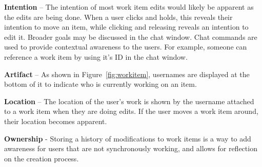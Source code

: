\documentclass[conference]{IEEEtran}
\begin{document}
{\bf Intention} – The intention of most work item edits would likely be apparent as the edits are being done. When a user clicks and holds, this reveals their intention to move an item, while clicking and releasing reveals an intention to edit it. Broader goals may be discussed in the chat window. Chat commands are used to provide contextual awareness to the users.  For example, someone can reference a work item by using it's ID in the chat window.
 
{\bf Artifact} – As shown in Figure~\ref{fig:workitem}, usernames are displayed at the bottom of it to indicate who is currently working on an item.

{\bf Location} – The location of the user’s work is shown by the username attached to a work item when they are doing edits. If the user moves a work item around, their location becomes apparent.

{\bf Ownership} - Storing a history of modifications to work items is a way to add awareness for users that are not synchronously working, and allows for reflection on the creation process.

%
%
\end{document}
